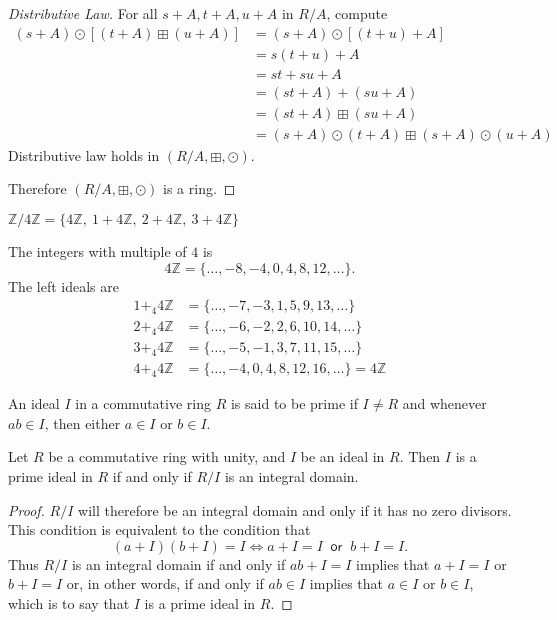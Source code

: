 \begin{proof}
    [Distributive Law]  For all $s+A, t+A, u+A$ in $R/A$, compute 
    \begin{align*}
        (s+A) \odot [(t+A) \boxplus (u+A)] &= (s+A) \odot [(t+u) + A]\\
        &= s(t+u) + A\\
        &= st + su + A\\
        &= (st + A) + (su + A)\\
        &= (st+A) \boxplus (su+A)\\
        &= (s+A) \odot (t+A) \boxplus (s+A) \odot (u+A)
    \end{align*}
    Distributive law holds in $(R/A, \boxplus, \odot)$.

    Therefore $(R/A, \boxplus, \odot)$ is a ring.
\end{proof}

\begin{example}
    $\mathbb{Z}/4\mathbb{Z} = \{ 4\mathbb{Z},\>  1 + 4\mathbb{Z},\>  2+4\mathbb{Z},\> 3+4\mathbb{Z} \}$
\end{example}
\begin{solution}
    The integers with multiple of $4$ is 
    \[
        4\mathbb{Z} = \{\ldots, -8, -4, 0, 4, 8, 12, \ldots \}.
    \]
    The left ideals are 
    \begin{align*}
        1+_4 4\mathbb{Z} &= \{ \ldots, -7, -3, 1, 5, 9, 13, \ldots \}\\
        2+_4 4\mathbb{Z} &= \{ \ldots, -6, -2, 2, 6, 10, 14, \ldots \}\\
        3+_4 4\mathbb{Z} &= \{ \ldots, -5, -1, 3, 7, 11, 15, \ldots \}\\
        4+_4 4\mathbb{Z} &= \{ \ldots, -4, 0, 4, 8, 12, 16, \ldots \} = 4\mathbb{Z}
    \end{align*}
\end{solution}

\begin{definition}
    An ideal $I$ in a commutative ring $R$ is said to be prime if $I \neq R$ and whenever 
    $ab \in I$, then either $a \in I$ or $b \in I$.
\end{definition}

\begin{lemma}
    Let $R$ be a commutative ring with unity, and $I$ be an ideal in $R$. Then $I$ is 
    a prime ideal in $R$ if and only if $R/I$ is an integral domain.
\end{lemma}
\begin{proof}
    $R/I$ will therefore be an integral domain and only if it has no zero divisors. This condition 
    is equivalent to the condition that 
    \[
        (a+I)(b+I) = I \iff a + I = I \> \textsf{ or } \> b + I = I.
    \]
    Thus $R/I$ is an integral domain if and only if $ab + I = I$ implies that 
    $a + I = I$ or $b+I = I$ or, in other words, if and only if 
    $ab \in I$ implies that $a \in I$ or $b \in I$, which is to say that $I$ is a prime ideal 
    in $R$. 
\end{proof}

